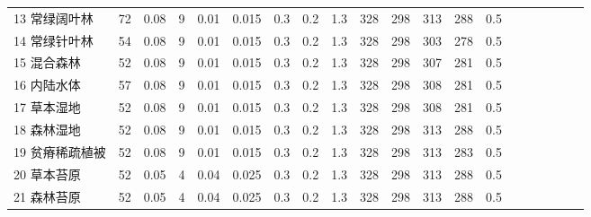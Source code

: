 \begin{landscape}
\begin{table}[htbp]
\begin{tabular}{@{}lccccccccccccccccccc@{}}
      13 常绿阔叶林             & 72                   & 0.08     & 9   & 0.01 & 0.015               & 0.3   & 0.2   & 1.3   & 328               & 298               & 313                 & 288                & 0.5                \\
      14 常绿针叶林             & 54                   & 0.08     & 9   & 0.01 & 0.015               & 0.3   & 0.2   & 1.3   & 328               & 298               & 303                 & 278                & 0.5                \\
      15 混合森林               & 52                   & 0.08     & 9   & 0.01 & 0.015               & 0.3   & 0.2   & 1.3   & 328               & 298               & 307                 & 281                & 0.5                \\
      16 内陆水体               & 57                   & 0.08     & 9   & 0.01 & 0.015               & 0.3   & 0.2   & 1.3   & 328               & 298               & 308                 & 281                & 0.5                \\
      17 草本湿地               & 52                   & 0.08     & 9   & 0.01 & 0.015               & 0.3   & 0.2   & 1.3   & 328               & 298               & 308                 & 281                & 0.5                \\
      18 森林湿地               & 52                   & 0.08     & 9   & 0.01 & 0.015               & 0.3   & 0.2   & 1.3   & 328               & 298               & 313                 & 288                & 0.5                \\
      19 贫瘠稀疏植被           & 52                   & 0.08     & 9   & 0.01 & 0.015               & 0.3   & 0.2   & 1.3   & 328               & 298               & 313                 & 283                & 0.5                \\
      20 草本苔原               & 52                   & 0.05     & 4   & 0.04 & 0.025               & 0.3   & 0.2   & 1.3   & 328               & 298               & 313                 & 288                & 0.5                \\
      21 森林苔原               & 52                   & 0.05     & 4   & 0.04 & 0.025               & 0.3   & 0.2   & 1.3   & 328               & 298               & 313                 & 288                & 0.5                \\

\end{tabular}
\end{table}
\end{landscape}
